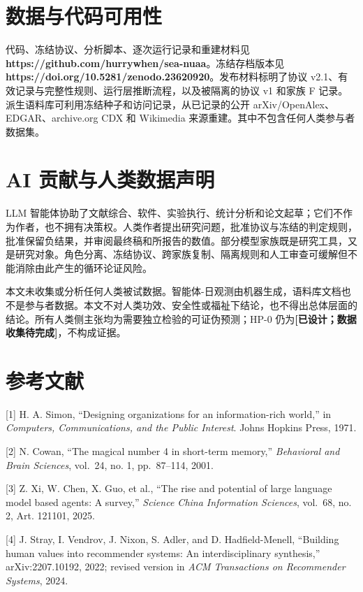 \documentclass[
  chinese,
  conference,10pt]{IEEEtran}
\begin{document}
\section{数据与代码可用性}\label{ux6570ux636eux4e0eux4ee3ux7801ux53efux7528ux6027}

代码、冻结协议、分析脚本、逐次运行记录和重建材料见 \textbf{https://github.com/hurrywhen/sea-nuaa}。冻结存档版本见 \textbf{https://doi.org/10.5281/zenodo.23620920}。发布材料标明了协议 v2.1、有效记录与完整性规则、运行层推断流程，以及被隔离的协议 v1 和家族 F 记录。派生语料库可利用冻结种子和访问记录，从已记录的公开 arXiv/OpenAlex、EDGAR、archive.org CDX 和 Wikimedia 来源重建。其中不包含任何人类参与者数据集。

\section{AI 贡献与人类数据声明}\label{ai-ux8d21ux732eux4e0eux4ebaux7c7bux6570ux636eux58f0ux660e}

LLM 智能体协助了文献综合、软件、实验执行、统计分析和论文起草；它们不作为作者，也不拥有决策权。人类作者提出研究问题，批准协议与冻结的判定规则，批准保留负结果，并审阅最终稿和所报告的数值。部分模型家族既是研究工具，又是研究对象。角色分离、冻结协议、跨家族复制、隔离规则和人工审查可缓解但不能消除由此产生的循环论证风险。

本文未收集或分析任何人类被试数据。智能体-日观测由机器生成，语料库文档也不是参与者数据。本文不对人类功效、安全性或福祉下结论，也不得出总体层面的结论。所有人类侧主张均为需要独立检验的可证伪预测；HP-0 仍为\textbf{{[}已设计；数据收集待完成{]}}，不构成证据。

\section{参考文献}\label{ux53c2ux8003ux6587ux732e}
\begingroup\footnotesize

{[}1{]} H. A. Simon, ``Designing organizations for an information-rich world,'' in \emph{Computers, Communications, and the Public Interest}. Johns Hopkins Press, 1971.

{[}2{]} N. Cowan, ``The magical number 4 in short-term memory,'' \emph{Behavioral and Brain Sciences}, vol.~24, no. 1, pp.~87--114, 2001.

{[}3{]} Z. Xi, W. Chen, X. Guo, et al., ``The rise and potential of large language model based agents: A survey,'' \emph{Science China Information Sciences}, vol.~68, no. 2, Art. 121101, 2025.

{[}4{]} J. Stray, I. Vendrov, J. Nixon, S. Adler, and D. Hadfield-Menell, ``Building human values into recommender systems: An interdisciplinary synthesis,'' arXiv:2207.10192, 2022; revised version in \emph{ACM Transactions on Recommender Systems}, 2024.
\end{document}
